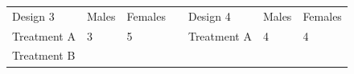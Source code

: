 \documentclass[]{book}
\theoremstyle{definition}
\theoremstyle{definition}
\theoremstyle{remark}
\begin{document}
\begin{longtable}[]{@{}lllllll@{}}
\toprule
\begin{minipage}[t]{0.13\columnwidth}\raggedright\strut
Design 3\strut
\end{minipage} & \begin{minipage}[t]{0.08\columnwidth}\raggedright\strut
Males\strut
\end{minipage} & \begin{minipage}[t]{0.09\columnwidth}\raggedright\strut
Females\strut
\end{minipage} & \begin{minipage}[t]{0.22\columnwidth}\raggedright\strut
\strut
\end{minipage} & \begin{minipage}[t]{0.13\columnwidth}\raggedright\strut
Design 4\strut
\end{minipage} & \begin{minipage}[t]{0.07\columnwidth}\raggedright\strut
Males\strut
\end{minipage} & \begin{minipage}[t]{0.09\columnwidth}\raggedright\strut
Females\strut
\end{minipage}\tabularnewline
\begin{minipage}[t]{0.13\columnwidth}\raggedright\strut
Treatment A\strut
\end{minipage} & \begin{minipage}[t]{0.08\columnwidth}\raggedright\strut
3\strut
\end{minipage} & \begin{minipage}[t]{0.09\columnwidth}\raggedright\strut
5\strut
\end{minipage} & \begin{minipage}[t]{0.22\columnwidth}\raggedright\strut
\strut
\end{minipage} & \begin{minipage}[t]{0.13\columnwidth}\raggedright\strut
Treatment A\strut
\end{minipage} & \begin{minipage}[t]{0.07\columnwidth}\raggedright\strut
4\strut
\end{minipage} & \begin{minipage}[t]{0.09\columnwidth}\raggedright\strut
4\strut
\end{minipage}\tabularnewline
\begin{minipage}[t]{0.13\columnwidth}\raggedright\strut
Treatment B\strut
\end{minipage} & \begin{minipage}[t]{0.08\columnwidth}\raggedright\strut

\end{minipage}
\end{longtable}
\end{document}

